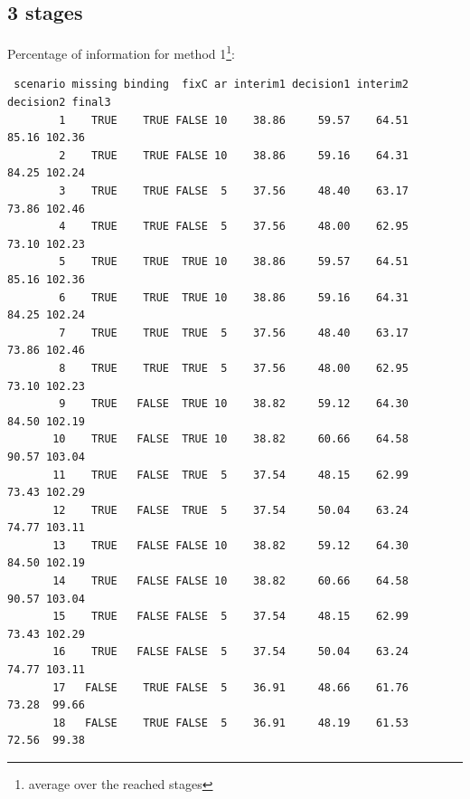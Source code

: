 \documentclass[12pt]{article}
\begin{document}
\subsection{3 stages}
\label{sec:org5aeab4a}
Percentage of information for method 1\footnote{average over the reached stages}:
\begin{verbatim}
 scenario missing binding  fixC ar interim1 decision1 interim2 decision2 final3
        1    TRUE    TRUE FALSE 10    38.86     59.57    64.51     85.16 102.36
        2    TRUE    TRUE FALSE 10    38.86     59.16    64.31     84.25 102.24
        3    TRUE    TRUE FALSE  5    37.56     48.40    63.17     73.86 102.46
        4    TRUE    TRUE FALSE  5    37.56     48.00    62.95     73.10 102.23
        5    TRUE    TRUE  TRUE 10    38.86     59.57    64.51     85.16 102.36
        6    TRUE    TRUE  TRUE 10    38.86     59.16    64.31     84.25 102.24
        7    TRUE    TRUE  TRUE  5    37.56     48.40    63.17     73.86 102.46
        8    TRUE    TRUE  TRUE  5    37.56     48.00    62.95     73.10 102.23
        9    TRUE   FALSE  TRUE 10    38.82     59.12    64.30     84.50 102.19
       10    TRUE   FALSE  TRUE 10    38.82     60.66    64.58     90.57 103.04
       11    TRUE   FALSE  TRUE  5    37.54     48.15    62.99     73.43 102.29
       12    TRUE   FALSE  TRUE  5    37.54     50.04    63.24     74.77 103.11
       13    TRUE   FALSE FALSE 10    38.82     59.12    64.30     84.50 102.19
       14    TRUE   FALSE FALSE 10    38.82     60.66    64.58     90.57 103.04
       15    TRUE   FALSE FALSE  5    37.54     48.15    62.99     73.43 102.29
       16    TRUE   FALSE FALSE  5    37.54     50.04    63.24     74.77 103.11
       17   FALSE    TRUE FALSE  5    36.91     48.66    61.76     73.28  99.66
       18   FALSE    TRUE FALSE  5    36.91     48.19    61.53     72.56  99.38
\end{verbatim}
\end{document}

